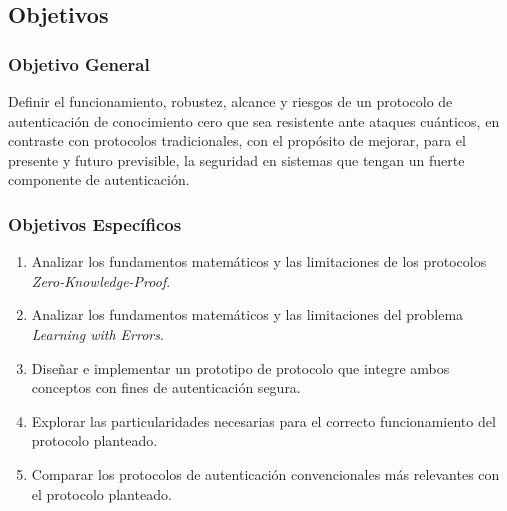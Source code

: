 \subsection{Objetivos}

\subsubsection{Objetivo General}
Definir el funcionamiento, robustez, alcance y riesgos de un protocolo de autenticación de conocimiento cero que sea resistente ante ataques cuánticos, en contraste con protocolos tradicionales, con el propósito de mejorar, para el presente y futuro previsible, la seguridad en sistemas que tengan un fuerte componente de autenticación.

\subsubsection{Objetivos Específicos}
\begin{enumerate}
    \item Analizar los fundamentos matemáticos y las limitaciones de los protocolos \textit{Zero-Knowledge-Proof}.
    \item Analizar los fundamentos matemáticos y las limitaciones del problema \textit{Learning with Errors}.
    \item Diseñar e implementar un prototipo de protocolo que integre ambos conceptos con fines de autenticación segura.
    \item Explorar las particularidades necesarias para el correcto funcionamiento del protocolo planteado.
    \item Comparar los protocolos de autenticación convencionales más relevantes con el protocolo planteado.
\end{enumerate}